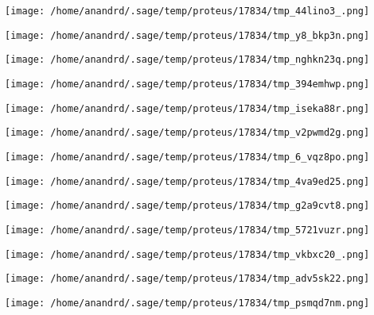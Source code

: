\documentclass[11pt]{article}
\begin{document}
\begin{center}
\texttt{[image: /home/anandrd/.sage/temp/proteus/17834/tmp\_44lino3\_.png]}
\end{center}
\begin{center}
\texttt{[image: /home/anandrd/.sage/temp/proteus/17834/tmp\_y8\_bkp3n.png]}
\end{center}
\begin{center}
\texttt{[image: /home/anandrd/.sage/temp/proteus/17834/tmp\_nghkn23q.png]}
\end{center}
\begin{center}
\texttt{[image: /home/anandrd/.sage/temp/proteus/17834/tmp\_394emhwp.png]}
\end{center}
\begin{center}
\texttt{[image: /home/anandrd/.sage/temp/proteus/17834/tmp\_iseka88r.png]}
\end{center}
\begin{center}
\texttt{[image: /home/anandrd/.sage/temp/proteus/17834/tmp\_v2pwmd2g.png]}
\end{center}
\begin{center}
\texttt{[image: /home/anandrd/.sage/temp/proteus/17834/tmp\_6\_vqz8po.png]}
\end{center}
\begin{center}
\texttt{[image: /home/anandrd/.sage/temp/proteus/17834/tmp\_4va9ed25.png]}
\end{center}
\begin{center}
\texttt{[image: /home/anandrd/.sage/temp/proteus/17834/tmp\_g2a9cvt8.png]}
\end{center}
\begin{center}
\texttt{[image: /home/anandrd/.sage/temp/proteus/17834/tmp\_5721vuzr.png]}
\end{center}
\begin{center}
\texttt{[image: /home/anandrd/.sage/temp/proteus/17834/tmp\_vkbxc20\_.png]}
\end{center}
\begin{center}
\texttt{[image: /home/anandrd/.sage/temp/proteus/17834/tmp\_adv5sk22.png]}
\end{center}
\begin{center}
\texttt{[image: /home/anandrd/.sage/temp/proteus/17834/tmp\_psmqd7nm.png]}
\end{center}
\end{document}
